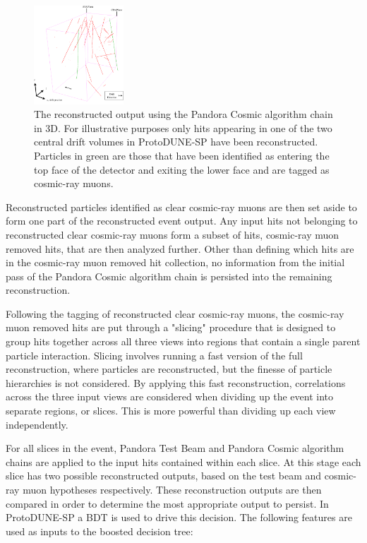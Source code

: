 \begin{figure}
\centering
\includegraphics[width=0.3\textwidth]{Figures/Diagram/InTime/TopBottom.pdf}
\caption{The reconstructed output using the Pandora Cosmic algorithm chain in 3D.  For illustrative purposes only hits appearing in one of the two central drift volumes in ProtoDUNE-SP have been reconstructed.  Particles in green are those that have been identified as entering the top face of the detector and exiting the lower face and are tagged as cosmic-ray muons.}
\label{fig:crtopbottom}
\end{figure}

Reconstructed particles identified as clear cosmic-ray muons are then set aside to form one part of the reconstructed event output.  Any input hits not belonging to reconstructed clear cosmic-ray muons form a subset of hits, cosmic-ray muon removed hits, that are then analyzed further.  Other than defining which hits are in the cosmic-ray muon removed hit collection, no information from the initial pass of the Pandora Cosmic algorithm chain is persisted into the remaining reconstruction.  

Following the tagging of reconstructed clear cosmic-ray muons, the cosmic-ray muon removed hits are put through a "slicing" procedure that is designed to group hits together across all three views into regions that contain a single parent particle interaction.    Slicing involves running a fast version of the full reconstruction, where particles are reconstructed, but the finesse of particle hierarchies is not considered.  By applying this fast reconstruction, correlations across the three input views are considered when dividing up the event into separate regions, or slices.  This is more powerful than dividing up each view independently.  

For all slices in the event, Pandora Test Beam and Pandora Cosmic algorithm chains are applied to the input hits contained within each slice.  At this stage each slice has two possible reconstructed outputs, based on the test beam and cosmic-ray muon hypotheses respectively.  These reconstruction outputs are then compared in order to determine the most appropriate output to persist.  In ProtoDUNE-SP a BDT is used to drive this decision.  The following features are used as inputs to the boosted decision tree:

